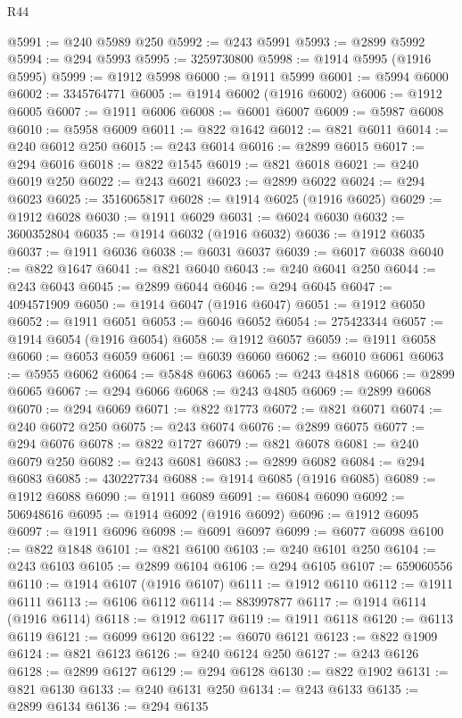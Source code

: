 \begin{lexlean}{R44}
\begin{coremodule}
{@5991 := @240 @5989 @250
@5992 := @243 @5991
@5993 := @2899 @5992
@5994 := @294 @5993
@5995 := 3259730800
@5998 := @1914 @5995 (@1916 @5995)
@5999 := @1912 @5998
@6000 := @1911 @5999
@6001 := @5994 @6000
@6002 := 3345764771
@6005 := @1914 @6002 (@1916 @6002)
@6006 := @1912 @6005
@6007 := @1911 @6006
@6008 := @6001 @6007
@6009 := @5987 @6008
@6010 := @5958 @6009
@6011 := @822 @1642
@6012 := @821 @6011
@6014 := @240 @6012 @250
@6015 := @243 @6014
@6016 := @2899 @6015
@6017 := @294 @6016
@6018 := @822 @1545
@6019 := @821 @6018
@6021 := @240 @6019 @250
@6022 := @243 @6021
@6023 := @2899 @6022
@6024 := @294 @6023
@6025 := 3516065817
@6028 := @1914 @6025 (@1916 @6025)
@6029 := @1912 @6028
@6030 := @1911 @6029
@6031 := @6024 @6030
@6032 := 3600352804
@6035 := @1914 @6032 (@1916 @6032)
@6036 := @1912 @6035
@6037 := @1911 @6036
@6038 := @6031 @6037
@6039 := @6017 @6038
@6040 := @822 @1647
@6041 := @821 @6040
@6043 := @240 @6041 @250
@6044 := @243 @6043
@6045 := @2899 @6044
@6046 := @294 @6045
@6047 := 4094571909
@6050 := @1914 @6047 (@1916 @6047)
@6051 := @1912 @6050
@6052 := @1911 @6051
@6053 := @6046 @6052
@6054 := 275423344
@6057 := @1914 @6054 (@1916 @6054)
@6058 := @1912 @6057
@6059 := @1911 @6058
@6060 := @6053 @6059
@6061 := @6039 @6060
@6062 := @6010 @6061
@6063 := @5955 @6062
@6064 := @5848 @6063
@6065 := @243 @4818
@6066 := @2899 @6065
@6067 := @294 @6066
@6068 := @243 @4805
@6069 := @2899 @6068
@6070 := @294 @6069
@6071 := @822 @1773
@6072 := @821 @6071
@6074 := @240 @6072 @250
@6075 := @243 @6074
@6076 := @2899 @6075
@6077 := @294 @6076
@6078 := @822 @1727
@6079 := @821 @6078
@6081 := @240 @6079 @250
@6082 := @243 @6081
@6083 := @2899 @6082
@6084 := @294 @6083
@6085 := 430227734
@6088 := @1914 @6085 (@1916 @6085)
@6089 := @1912 @6088
@6090 := @1911 @6089
@6091 := @6084 @6090
@6092 := 506948616
@6095 := @1914 @6092 (@1916 @6092)
@6096 := @1912 @6095
@6097 := @1911 @6096
@6098 := @6091 @6097
@6099 := @6077 @6098
@6100 := @822 @1848
@6101 := @821 @6100
@6103 := @240 @6101 @250
@6104 := @243 @6103
@6105 := @2899 @6104
@6106 := @294 @6105
@6107 := 659060556
@6110 := @1914 @6107 (@1916 @6107)
@6111 := @1912 @6110
@6112 := @1911 @6111
@6113 := @6106 @6112
@6114 := 883997877
@6117 := @1914 @6114 (@1916 @6114)
@6118 := @1912 @6117
@6119 := @1911 @6118
@6120 := @6113 @6119
@6121 := @6099 @6120
@6122 := @6070 @6121
@6123 := @822 @1909
@6124 := @821 @6123
@6126 := @240 @6124 @250
@6127 := @243 @6126
@6128 := @2899 @6127
@6129 := @294 @6128
@6130 := @822 @1902
@6131 := @821 @6130
@6133 := @240 @6131 @250
@6134 := @243 @6133
@6135 := @2899 @6134
@6136 := @294 @6135
}
\end{coremodule}
\end{lexlean}
